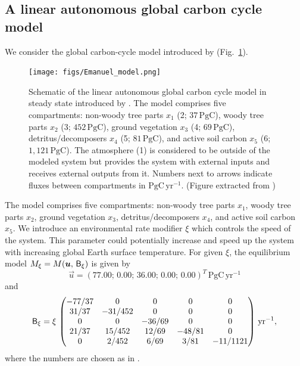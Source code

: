 \documentclass[smallextended]{svjour3}
\newcommand{\peta}{\mathrm{P}}
\newcommand{\gC}{\mathrm{gC}}
\newcommand{\yr}{\mathrm{yr}}
\newcommand{\transpose}{T}
\begin{document}
\subsection{A linear autonomous global carbon cycle model}
\label{sec:example_1}
We consider the global carbon-cycle model introduced by \citet{Emanuel1981} (Fig.~\ref{fig:Emanuel_model}).
\begin{figure}%
    \centering
    \texttt{[image: figs/Emanuel\_model.png]}
    \caption{Schematic of the linear autonomous global carbon cycle model in steady state introduced by \citet{Emanuel1981}. 
      The model comprises five compartments: non-woody tree parts $x_1$ (2; $37\,\peta\gC$), woody tree parts $x_2$ (3; $452\,\peta\gC$), ground vegetation $x_3$ (4; $69\,\peta\gC$), detritus/decomposers $x_4$ (5; $81\,\peta\gC$), and active soil carbon $x_5$ (6; $1,121\,\peta\gC$). The atmosphere (1) is considered to be outside of the modeled system but provides the system with external inputs and receives external outputs from it. Numbers next to arrows indicate fluxes between compartments in $\peta\gC\,\yr^{-1}$. (Figure extracted from \citealt{Emanuel1981})}\label{fig:Emanuel_model}
\end{figure}
The model comprises five compartments: non-woody tree parts $x_1$, woody tree parts $x_2$, ground vegetation $x_3$, detritus/decomposers $x_4$, and active soil carbon $x_5$.
We introduce an environmental rate modifier $\xi$ which controls the speed of the system.
This parameter could potentially increase and speed up the system with increasing global Earth surface temperature.
For given $\xi$, the equilibrium model $M_\xi=M(\vec{u},\,\tens{B}_\xi)$ is given by
\begin{equation*}
  \vec{u} = (77.00;\,0.00;\,36.00;\,0.00;\,0.00)^{\transpose}\, \peta\gC\,\yr^{-1}
\end{equation*}
and
\begin{equation*}
    \tens{B}_\xi = \xi\,\left(\begin{matrix}
      -77/37 &       0 &      0 &      0 & 	  0\\
       31/37 & -31/452 &      0 &      0 & 	  0\\
	   0 &       0 & -36/69 &      0 & 	  0\\
       21/37 &  15/452 &  12/69 & -48/81 & 	  0\\
	   0 &   2/452 &   6/69 &   3/81 & -11/1121
	 \end{matrix}\right)\,\yr^{-1},
\end{equation*}
where the numbers are chosen as in \citet{Thompson1999GCB}. 
\end{document}
